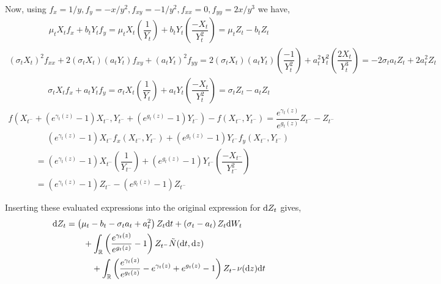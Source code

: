 \begin{solution}[Solution]
\begin{enumerate}[label=(\alph*)]
        Now, using \( f_x = 1/y, f_y = -x/y^2, f_{xy} = -1/y^2, f_{xx} = 0, f_{yy} = 2x/y^3 \) we have,
        \begin{align*}
             \mu_t X_t f_x + b_tY_t f_y %
            = \mu_t X_t \left( \dfrac{1}{Y_t} \right) + b_t Y_t \left( \dfrac{-X_t}{Y_t^2} \right)
            = \mu_t Z_t - b_t Z_t
        \end{align*}
        \begin{align*}
            (\sigma_t X_t)^2 f_{xx} + 2(\sigma_t X_t)(a_tY_t) f_{xy} +  (a_tY_t)^2 f_{yy} 
            = 2(\sigma_t X_t)(a_tY_t) \left( \dfrac{-1}{Y_t^2} \right) + a_t^2 Y_t^2 \left( \dfrac{2X_t}{Y_t^3} \right)
            = -2\sigma_ta_tZ_t + 2a_t^2 Z_t 
        \end{align*}
        \begin{align*}
            \sigma_t X_t f_x + a_t Y_t f_y 
            = \sigma_t X_t \left( \dfrac{1}{Y_t} \right) + a_t Y_t \left( \dfrac{-X_t}{Y_t^2} \right)
            = \sigma_t Z_t - a_t Z_t 
        \end{align*}
        \begin{align*}
             f \left(X_{t^-}+(e^{\gamma_t(z)}-1)X_{t^-},Y_{t^-} + (e^{g_t(z)}-1)Y_{t^-} \right)  - f(X_{t^-},Y_{t^-}) 
            =  \dfrac{e^{\gamma_t(z)}}{e^{g_t(z)}} Z_{t^-} - Z_{t^-}
        \end{align*}
        \begin{align*}    
            & \phantom{{}={}}(e^{\gamma_t(z)}-1) X_{t^-} f_x(X_{t^-},Y_{t^-}) + (e^{g_t(z)}-1)Y_{t^-} f_y(X_{t^-},Y_{t^-})
            \\&= (e^{\gamma_t(z)}-1) X_{t^-} \left( \dfrac{1}{Y_{t^-}} \right)
            + (e^{g_t(z)}-1) Y_{t^-} \left( \dfrac{-X_{t^-}}{Y_{t^-}^2} \right)
            \\&= (e^{\gamma_t(z)}-1) Z_{t^-} - (e^{g_t(z)}-1)Z_{t^-}
        \end{align*}
       
        Inserting these evaluated expressions into the original expression for \( \mathrm{d} Z_t \) gives,
        \begin{align*}
            \mathrm{d} Z_t &= \left( \mu_t - b_t - \sigma_t a_t + a_t^2 \right)Z_t \mathrm{d} t
            + \left( \sigma_t - a_t \right) Z_t \mathrm{d} W_t
            \\& \hspace{2em}+ \int_{\mathbb{R}} \left( \dfrac{e^{\gamma_t(z)}}{e^{g_t(z)}}-1 \right)Z_{t^-} \tilde{N}(\mathrm{d} t, \mathrm{d} z)
            \\& \hspace{3em}+ \int_{\mathbb{R}} \left( \dfrac{e^{\gamma_t(z)}}{e^{g_t(z)}} - e^{\gamma_t(z)}+e^{g_t(z)}-1 \right)Z_{t^-} \nu(\mathrm{d} z)\mathrm{d} t
        \end{align*}
        

\end{enumerate}
\end{solution}

